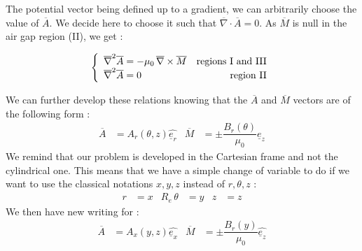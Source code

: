 The potential vector being defined up to a gradient, we can arbitrarily choose the value of $\overline{A}$. We decide here to choose it such that $\overline{\nabla} \cdot \overline{A} = 0$. As $\overline{M}$ is null in the air gap region (\rm II), we get :

\begin{equation}
\label{eq:regions}
\left\{
 \begin{array}{lr}
\overline{\nabla}^2 \overline{A} = - \mu_0\, \overline{\nabla} \times \overline{M} 
& \text{regions \rm I and \rm III} \\
\overline{\nabla}^2 \overline{A} = 0 
& \text{region \rm II}
 \end{array}
\right. 
\end{equation}

We can further develop these relations knowing that the $\overline{A}$ and $\overline{M}$ vectors are of the following form :
\begin{align*}
    \overline{A} &= A_r (\theta, z) \widehat{\underline{e}_r} &
    \overline{M} &= \pm \dfrac{B_r(\theta)}{\mu_0}\widehat{\underline{e}_z}
\end{align*}
We remind that our problem is developed in the Cartesian frame and not the cylindrical one. This means that we have a simple change of variable to do if we want to use the classical notations $x,y,z$ instead of $r,\theta,z$ :
\begin{align}
\label{eq:change_vars}
    r &= x &
    R_e\, \theta &= y &
    z &= z
\end{align}
We then have new writing for  :
\begin{align*}
     \overline{A} &= A_x (y, z) \widehat{\underline{e}_x} &
    \overline{M} &= \pm \dfrac{B_r(y)}{\mu_0}\widehat{\underline{e}_z}
\end{align*}

